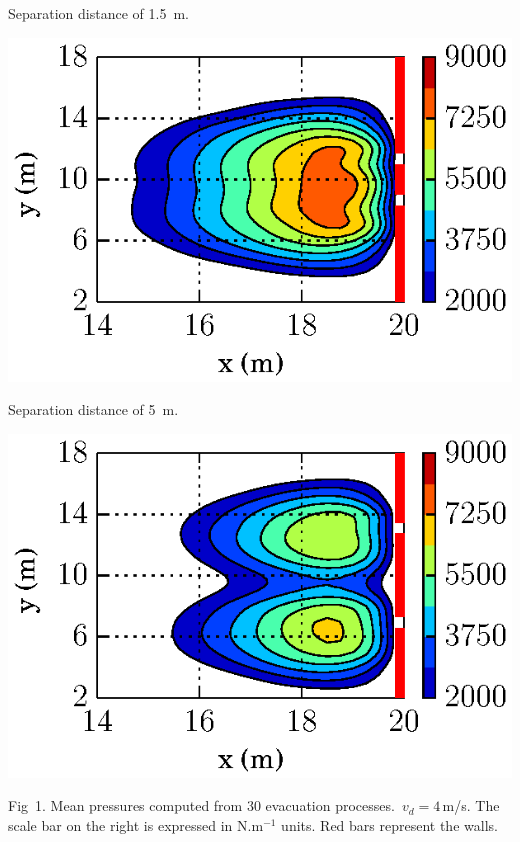 \documentclass[final]{baposter}
\begin{document}
\begin{poster}
{\Large
\vspace{2mm}
   \begin{minipage}{0.5\textwidth}
    \begin{center}
     Separation distance of 1.5~m.
     \end{center}
    \includegraphics[scale=0.72]{./figures2/fig16_version0.eps}
    \end{minipage}
    \begin{minipage}{0.5\textwidth}
    \begin{center}
    Separation distance of 5~m.
    \end{center}
    \includegraphics[scale=0.71]{./figures2/fig17_version0.eps}    
    \end{minipage}

\vspace{1.5mm}   
Fig~1. Mean pressures computed from 30 evacuation processes. 
$\,v_d=4\,$m/s. The scale bar on the right is expressed in N.m$^{-1}$ units. Red bars represent the walls.\\

}
\end{poster}
\end{document}

